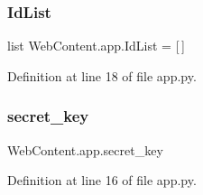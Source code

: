 \subsubsection{\texorpdfstring{Id\+List}{IdList}}
{\footnotesize\ttfamily list Web\+Content.\+app.\+Id\+List = \mbox{[}$\,$\mbox{]}}



Definition at line 18 of file app.\+py.

\mbox{\label{namespace_web_content_1_1app_a6092358451315e755637b56d42326052}} 
\subsubsection{\texorpdfstring{secret\+\_\+key}{secret\_key}}
{\footnotesize\ttfamily Web\+Content.\+app.\+secret\+\_\+key}



Definition at line 16 of file app.\+py.

